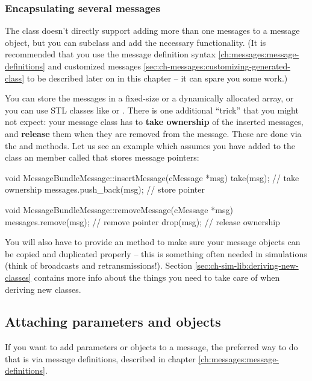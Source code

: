 \subsubsection{Encapsulating several messages}

The  class doesn't directly support adding more than one
messages to a message object, but you can subclass 
and add the necessary functionality. (It is recommended that you
use the message definition syntax \ref{ch:messages:message-definitions}
and customized messages \ref{sec:ch-messages:customizing-generated-class}
to be described later on in this chapter -- it can spare you some work.)

You can store the messages in a fixed-size or a dynamically allocated
array, or you can use STL classes like  or .
There is one additional ``trick'' that you might not expect: your message
class has to \textbf{take ownership} of the inserted messages, and
\textbf{release} them when they are removed from the message. These are
done via the  and  methods. Let us see
an example which assumes you have added to the class an  member
called  that stores message pointers:

\begin{cpp}
void MessageBundleMessage::insertMessage(cMessage *msg)
{
    take(msg);  // take ownership
    messages.push_back(msg);  // store pointer
}

void MessageBundleMessage::removeMessage(cMessage *msg)
{
    messages.remove(msg);  // remove pointer
    drop(msg);  // release ownership
}
\end{cpp}

You will also have to provide an  method to
make sure your message objects can be copied and duplicated
properly -- this is something often needed in simulations
(think of broadcasts and retransmissions!). Section
\ref{sec:ch-sim-lib:deriving-new-classes} contains more info
about the things you need to take care of when deriving new classes.



\subsection{Attaching parameters and objects}

If you want to add parameters or objects to a message, the preferred
way to do that is via message definitions, described in chapter
\ref{ch:messages:message-definitions}.


